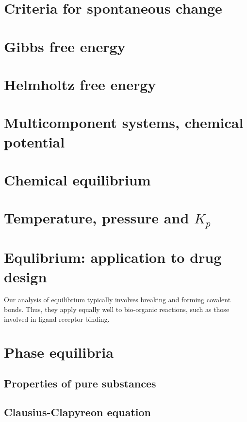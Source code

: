 \documentclass{article}
\numberwithin{theorem}{section}
\numberwithin{corollary}{section}
\numberwithin{postulate}{section}
\numberwithin{lemma}{section}
\numberwithin{definition}{section}
\begin{document}
\section{Criteria for spontaneous change}

\section{Gibbs free energy}

\section{Helmholtz free energy}

\section{Multicomponent systems, chemical potential}

\section{Chemical equilibrium}

\section{Temperature, pressure and $K_p$}

\section{Equlibrium: application to drug design}

Our analysis of equilibrium typically involves breaking and forming covalent
bonds. Thus, they apply equally well to bio-organic reactions, such as those
involved in ligand-receptor binding.

\section{Phase equilibria}

\subsection{Properties of pure substances}

\subsection{Clausius-Clapyreon equation}
\end{document}
